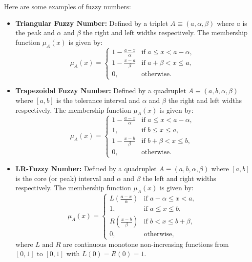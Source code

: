 \begin{example}\label{ex:fuzzy_num}
    Here are some examples of fuzzy numbers:
    \begin{itemize}
        \item \textbf{Triangular Fuzzy Number:} Defined by a triplet $A\equiv(a, \alpha, \beta)$ where $a$ is the peak and $\alpha$ and $\beta$ the right and left widths respectively. The membership function $\mu_A(x)$ is given by:
        \[
        \mu_A(x) = 
        \begin{cases} 
        1-\frac{a-x}{\alpha} & \text{if } a \leq x < a-\alpha, \\
        1-\frac{x-a}{\beta} & \text{if } a+\beta < x \leq a, \\
        0, & \text{otherwise.}
        \end{cases}
        \]
        
        \item \textbf{Trapezoidal Fuzzy Number:} Defined by a quadruplet $A\equiv(a, b, \alpha, \beta)$ where $[a,b]$ is the tolerance interval and $\alpha$ and $\beta$ the right and left widths respectively. The membership function $\mu_A(x)$ is given by:
        \[
        \mu_A(x) = 
        \begin{cases} 
        1-\frac{a-x}{\alpha} & \text{if } a \leq x < a-\alpha, \\
        1, & \text{if } b \leq x \leq a, \\
        1-\frac{x-b}{\beta} & \text{if } b+\beta < x \leq b, \\
        0, & \text{otherwise.}
        \end{cases}
        \]
        
        \item \textbf{LR-Fuzzy Number:} Defined by a quadruplet $A\equiv(a, b, \alpha, \beta)$ where $[a,b]$ is the core (or peak) interval and $\alpha$ and $\beta$ the left and right widths respectively. The membership function $\mu_A(x)$ is given by:
        \[
        \mu_A(x) = 
        \begin{cases} 
        L\left(\frac{a-x}{\alpha}\right) & \text{if } a-\alpha \leq x < a, \\
        1, & \text{if } a \leq x \leq b, \\
        R\left(\frac{x-b}{\beta}\right) & \text{if } b < x \leq b+\beta, \\
        0, & \text{otherwise,}
        \end{cases}
        \]
        where $L$ and $R$ are continuous monotone non-increasing functions from $[0,1]$ to $[0,1]$ with $L(0)=R(0)=1$.
    \end{itemize}
\end{example}
    
